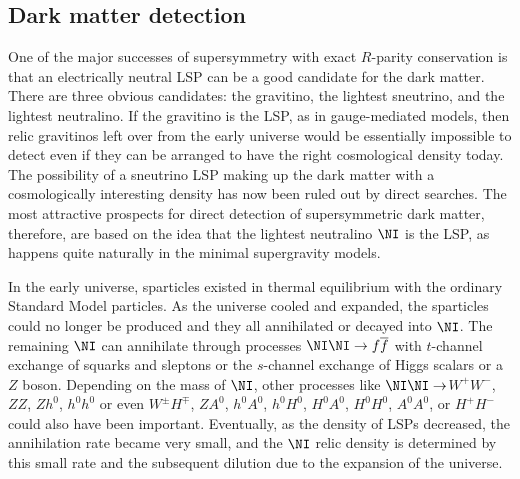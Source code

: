 \subsection{Dark matter detection}\label{subsec:signals.darkmatter}

One of the major successes of supersymmetry with
exact $R$-parity conservation is that an electrically neutral LSP can be
a good candidate for the dark matter.
There are three obvious candidates: the gravitino, the lightest sneutrino,
and the lightest neutralino.
If the gravitino is the LSP, as in gauge-mediated models, then
relic gravitinos left over from the early universe would be essentially
impossible to detect even if they can be arranged
to have the right cosmological density today.
The possibility of a sneutrino LSP
making up the dark matter with a cosmologically interesting
density has now been
ruled out by direct
searches.\cite{sneutrinonotLSP}
The most attractive prospects for direct
detection of supersymmetric dark matter, therefore,
are based on the idea that the lightest neutralino $\NI$ is the LSP,
as happens quite naturally in the minimal supergravity models.

In the early universe, sparticles
existed in thermal equilibrium with the ordinary Standard Model particles.
As the universe cooled and expanded, the sparticles could no longer
be produced and they all annihilated or decayed into $\NI$. The
remaining $\NI$ can annihilate through processes
$\NI\NI \rightarrow f\overline f$ with $t$-channel exchange
of squarks and sleptons or the $s$-channel exchange of
Higgs scalars or a $Z$ boson. Depending on the mass of $\NI$,
other processes like $\NI\NI\rightarrow$$W^+W^-$, $ZZ$,
$Zh^0$, $h^0h^0$ or even $W^\pm H^\mp$,
$Z A^0$, $h^0 A^0$, $h^0 H^0$, $H^0 A^0$, $H^0H^0$, $A^0 A^0$,
or $H^+H^-$ could also have been important. Eventually,
as the density of LSPs decreased, the annihilation rate became very small,
and the $\NI$ relic density is determined by this small rate
and the
subsequent dilution
due to the expansion of the universe.

